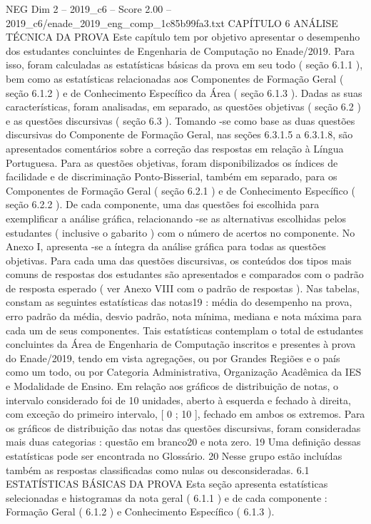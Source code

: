 \begin{textsample}{NEG Dim 2 – 2019\_c6 – Score 2.00 – 2019\_c6/enade\_2019\_eng\_comp\_1c85b99fa3.txt}  \label{ex:f2_neg_283}
CAPÍTULO 6 ANÁLISE TÉCNICA DA PROVA Este capítulo tem por objetivo apresentar o desempenho dos estudantes concluintes de Engenharia de Computação no Enade/2019.
Para isso, foram calculadas as estatísticas básicas da prova em seu todo ( seção 6.1.1 ), bem como as estatísticas relacionadas aos Componentes de Formação Geral ( seção 6.1.2 ) e de Conhecimento Específico da Área ( seção 6.1.3 ).
Dadas as suas características, foram analisadas, em separado, as questões objetivas ( seção 6.2 ) e as questões discursivas ( seção 6.3 ).
Tomando -se como base as duas questões discursivas do Componente de Formação Geral, nas seções 6.3.1.5 a 6.3.1.8, são apresentados comentários sobre a correção das respostas em relação à Língua Portuguesa.
Para as questões objetivas, foram disponibilizados os índices de facilidade e de discriminação Ponto-Bisserial, também em separado, para os Componentes de Formação Geral ( seção 6.2.1 ) e de Conhecimento Específico ( seção 6.2.2 ).
De cada componente, uma das questões foi escolhida para exemplificar a análise gráfica, relacionando -se as alternativas escolhidas pelos estudantes ( inclusive o gabarito ) com o número de acertos no componente.
No Anexo I, apresenta -se a íntegra da análise gráfica para todas as questões objetivas.
Para cada uma das questões discursivas, os conteúdos dos tipos mais comuns de respostas dos estudantes são apresentados e comparados com o padrão de resposta esperado ( ver Anexo VIII com o padrão de respostas ).
Nas tabelas, constam as seguintes estatísticas das notas19 : média do desempenho na prova, erro padrão da média, desvio padrão, nota mínima, mediana e nota máxima para cada um de seus componentes.
Tais estatísticas contemplam o total de estudantes concluintes da Área de Engenharia de Computação inscritos e presentes à prova do Enade/2019, tendo em vista agregações, ou por Grandes Regiões e o país como um todo, ou por Categoria Administrativa, Organização Acadêmica da IES e Modalidade de Ensino.
Em relação aos gráficos de distribuição de notas, o intervalo considerado foi de 10 unidades, aberto à esquerda e fechado à direita, com exceção do primeiro intervalo, [ 0 ; 10 ], fechado em ambos os extremos.
Para os gráficos de distribuição das notas das questões discursivas, foram consideradas mais duas categorias : questão em branco20 e nota zero. 19 Uma definição dessas estatísticas pode ser encontrada no Glossário. 20 Nesse grupo estão incluídas também as respostas classificadas como nulas ou desconsideradas. 6.1 ESTATÍSTICAS BÁSICAS DA PROVA Esta seção apresenta estatísticas selecionadas e histogramas da nota geral ( 6.1.1 ) e de cada componente : Formação Geral ( 6.1.2 ) e Conhecimento Específico ( 6.1.3 ).

\end{textsample}
